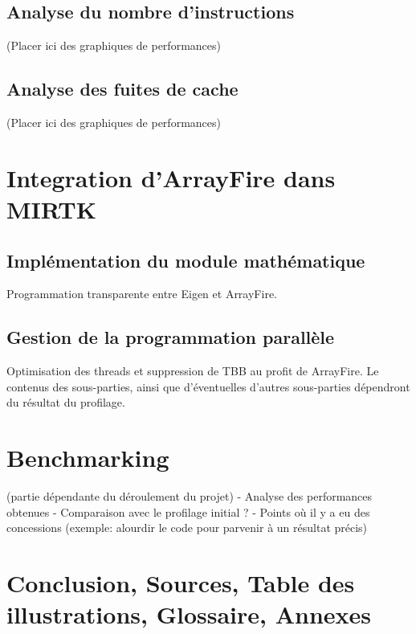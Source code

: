 \documentclass[12pt]{report}
\begin{document}
	\subsection{Analyse du nombre d'instructions}
	
	(Placer ici des graphiques de performances)
	\subsection{Analyse des fuites de cache}
	
	(Placer ici des graphiques de performances)
	
	\section{Integration d'ArrayFire dans MIRTK}
	\subsection{Implémentation du module mathématique}
	Programmation transparente entre Eigen et ArrayFire.
	\subsection{Gestion de la programmation parallèle}
	Optimisation des threads et suppression de TBB au profit de ArrayFire.
	\newline
	Le contenus des sous-parties, ainsi que d'éventuelles d'autres sous-parties dépendront du résultat du profilage.
	\section{Benchmarking}
	(partie dépendante du déroulement du projet)
	- Analyse des performances obtenues \newline
	- Comparaison avec le profilage initial ? \newline
	- Points où il y a eu des concessions (exemple: alourdir le code pour parvenir à un résultat précis)
\section*{Conclusion, Sources, Table des illustrations, Glossaire, Annexes} %
	
\end{document}
